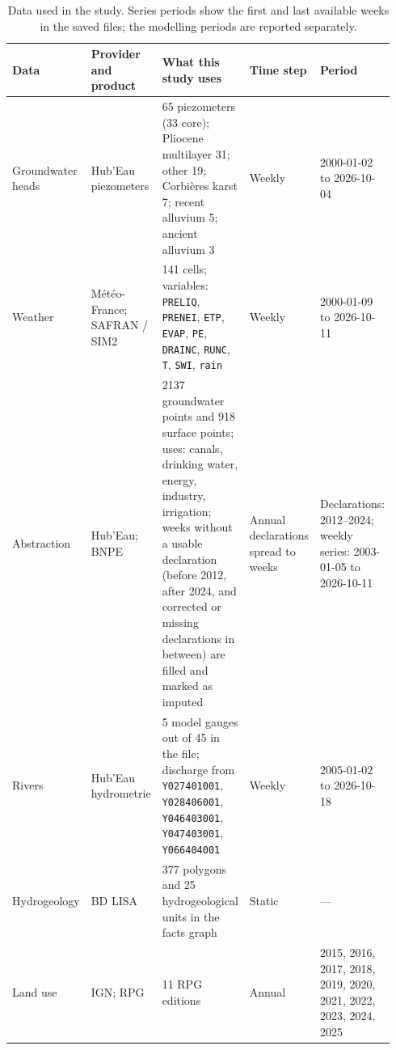 \begin{table}[p]
\centering
\scriptsize
\setlength{\tabcolsep}{2pt}
\caption{Data used in the study. Series periods show the first and last available weeks in the saved files; the modelling periods are reported separately.}
\label{tab:data-sources}
\begin{tabular}{@{}p{0.12\linewidth}p{0.16\linewidth}p{0.40\linewidth}p{0.10\linewidth}p{0.16\linewidth}@{}}
\toprule
Data & Provider and product & What this study uses & Time step & Period \\
\midrule
Groundwater heads & Hub'Eau piezometers & \num{65} piezometers (\num{33} core); Pliocene multilayer \num{31}; other \num{19}; Corbières karst \num{7}; recent alluvium \num{5}; ancient alluvium \num{3} & Weekly & 2000-01-02 to 2026-10-04 \\
\addlinespace
Weather & Météo-France; SAFRAN / SIM2 & \num{141} cells; variables: \texttt{PRELIQ}, \texttt{PRENEI}, \texttt{ETP}, \texttt{EVAP}, \texttt{PE}, \texttt{DRAINC}, \texttt{RUNC}, \texttt{T}, \texttt{SWI}, \texttt{rain} & Weekly & 2000-01-09 to 2026-10-11 \\
\addlinespace
Abstraction & Hub'Eau; BNPE & \num{2137} groundwater points and \num{918} surface points; uses: canals, drinking water, energy, industry, irrigation; weeks without a usable declaration (before \num{2012}, after \num{2024}, and corrected or missing declarations in between) are filled and marked as imputed & Annual declarations spread to weeks & Declarations: \num{2012}--\num{2024}; weekly series: 2003-01-05 to 2026-10-11 \\
\addlinespace
Rivers & Hub'Eau hydrometrie & \num{5} model gauges out of \num{45} in the file; discharge from \texttt{Y027401001}, \texttt{Y028406001}, \texttt{Y046403001}, \texttt{Y047403001}, \texttt{Y066404001} & Weekly & 2005-01-02 to 2026-10-18 \\
\addlinespace
Hydrogeology & BD LISA & \num{377} polygons and \num{25} hydrogeological units in the facts graph & Static & — \\
\addlinespace
Land use & IGN; RPG & \num{11} RPG editions & Annual & \num{2015}, \num{2016}, \num{2017}, \num{2018}, \num{2019}, \num{2020}, \num{2021}, \num{2022}, \num{2023}, \num{2024}, \num{2025} \\
\bottomrule
\end{tabular}
\end{table}
